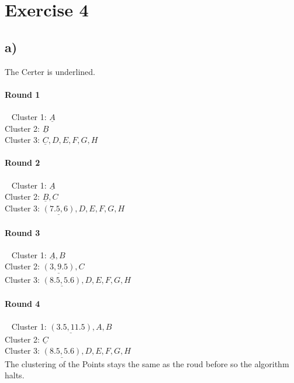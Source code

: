 \section*{Exercise 4}
\subsection*{a)}\small The Certer is underlined.\normalsize

\paragraph{Round 1}~\newline
Cluster 1: $\underline{A}$\\
Cluster 2: $\underline{B}$\\
Cluster 3: $\underline{C},D,E,F,G,H$

\paragraph{Round 2}~\newline
Cluster 1: $\underline{A}$\\
Cluster 2: $\underline{B},C$\\
Cluster 3: $\underline{(7.5,6)},D,E,F,G,H$

\paragraph{Round 3}~\newline
Cluster 1: $\underline{A},B$\\
Cluster 2: $\underline{(3,9.5)},C$\\
Cluster 3: $\underline{(8.5,5.6)},D,E,F,G,H$

\paragraph{Round 4}~\newline
Cluster 1: $\underline{(3.5,11.5)},A,B$\\
Cluster 2: $\underline{C}$\\
Cluster 3: $\underline{(8.5,5.6)},D,E,F,G,H$\\
The clustering of the Points stays the same as the roud before so the algorithm halts.

